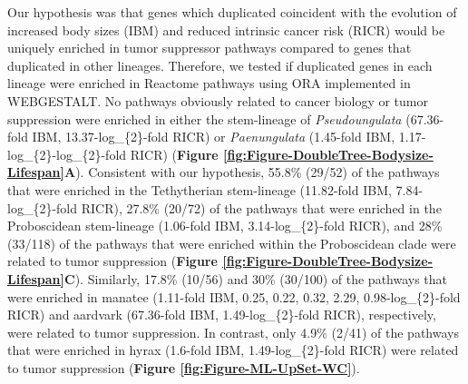 \documentclass[]{elsarticle} %
\begin{document}
Our hypothesis was that genes which duplicated coincident with the evolution of increased body sizes (IBM) and reduced intrinsic cancer risk (RICR) would be uniquely enriched in tumor suppressor pathways compared to genes that duplicated in other lineages. Therefore, we tested if duplicated genes in each lineage were enriched in Reactome pathways using ORA implemented in WEBGESTALT. No pathways obviously related to cancer biology or tumor suppression were enriched in either the stem-lineage of \emph{Pseudoungulata} (67.36-fold IBM, 13.37-log\_\{2\}-fold RICR) or \emph{Paenungulata} (1.45-fold IBM, 1.17-log\_\{2\}-log\_\{2\}-fold RICR) (\textbf{Figure \ref{fig:Figure-DoubleTree-Bodysize-Lifespan}A}). Consistent with our hypothesis, 55.8\% (29/52) of the pathways that were enriched in the Tethytherian stem-lineage (11.82-fold IBM, 7.84-log\_\{2\}-fold RICR), 27.8\% (20/72) of the pathways that were enriched in the Proboscidean stem-lineage (1.06-fold IBM, 3.14-log\_\{2\}-fold RICR), and 28\% (33/118) of the pathways that were enriched within the Proboscidean clade were related to tumor suppression (\textbf{Figure \ref{fig:Figure-DoubleTree-Bodysize-Lifespan}C}). Similarly, 17.8\% (10/56) and 30\% (30/100) of the pathways that were enriched in manatee (1.11-fold IBM, 0.25, 0.22, 0.32, 2.29, 0.98-log\_\{2\}-fold RICR) and aardvark (67.36-fold IBM, 1.49-log\_\{2\}-fold RICR), respectively, were related to tumor suppression. In contrast, only 4.9\% (2/41) of the pathways that were enriched in hyrax (1.6-fold IBM, 1.49-log\_\{2\}-fold RICR) were related to tumor suppression (\textbf{Figure \ref{fig:Figure-ML-UpSet-WC}}).
\end{document}
